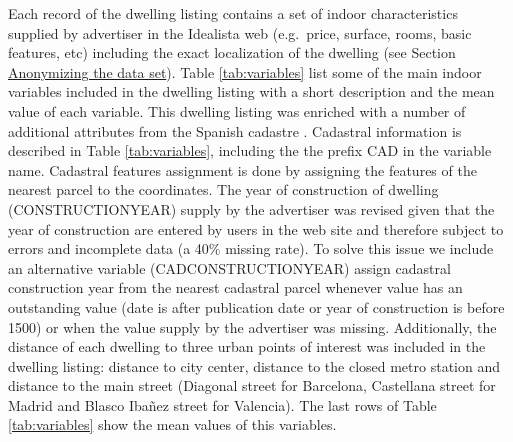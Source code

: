 \documentclass[Royal,times,sageh]{sagej}
\begin{document}
Each record of the dwelling listing contains a set of indoor
characteristics supplied by advertiser in the Idealista web (e.g.~price,
surface, rooms, basic features, etc) including the exact localization of
the dwelling (see Section \protect\hyperlink{anonymizing}{Anonymizing
the data set}). Table \ref{tab:variables} list some of the main indoor
variables included in the dwelling listing with a short description and
the mean value of each variable. This dwelling listing was enriched with
a number of additional attributes from the Spanish cadastre
\citep{Catastro}. Cadastral information is described in Table
\ref{tab:variables}, including the the prefix CAD in the variable name.
Cadastral features assignment is done by assigning the features of the
nearest parcel to the coordinates. The year of construction of dwelling
(CONSTRUCTIONYEAR) supply by the advertiser was revised given that the
year of construction are entered by users in the web site and therefore
subject to errors and incomplete data (a 40\% missing rate). To solve
this issue we include an alternative variable (CADCONSTRUCTIONYEAR)
assign cadastral construction year from the nearest cadastral parcel
whenever value has an outstanding value (date is after publication date
or year of construction is before 1500) or when the value supply by the
advertiser was missing. Additionally, the distance of each dwelling to
three urban points of interest was included in the dwelling listing:
distance to city center, distance to the closed metro station and
distance to the main street (Diagonal street for Barcelona, Castellana
street for Madrid and Blasco Ibañez street for Valencia). The last rows
of Table \ref{tab:variables} show the mean values of this variables.
\end{document}
